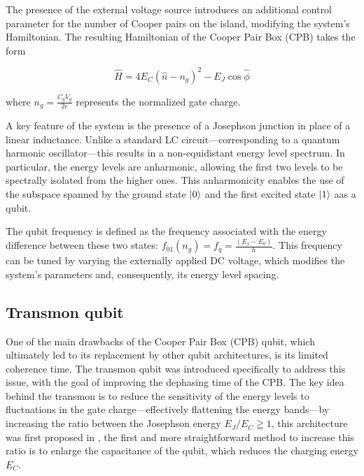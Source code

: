 The presence of the external voltage source introduces an additional control parameter for the number of Cooper pairs on the island, modifying the system's Hamiltonian. 
The resulting Hamiltonian of the Cooper Pair Box (CPB) takes the form

\begin{equation}\label{eq:CPB_complete}
    \hat{H} = 4E_C(\hat{n} - n_g)^2 - E_J \cos{\hat{\phi}}
\end{equation}

where $n_g = \frac{C_g V_g}{2e}$ represents the normalized gate charge.

A key feature of the system is the presence of a Josephson junction in place of a linear inductance. 
Unlike a standard LC circuit—corresponding to a quantum harmonic oscillator—this results in a non-equidistant energy level spectrum. 
In particular, the energy levels are anharmonic, allowing the first two levels to be spectrally isolated from the higher ones. 
This anharmonicity enables the use of the subspace spanned by the ground state $\ket{0}$ and the first excited state $\ket{1}$ aas a qubit.

The qubit frequency is defined as the frequency associated with the energy difference between these two states: $f_{01}(n_g) = f_q = \frac{(E_1 - E_0)}{h}$.
This frequency can be tuned by varying the externally applied DC voltage, which modifies the system’s parameters and, consequently, its energy level spacing.\\



\subsection{Transmon qubit}
One of the main drawbacks of the Cooper Pair Box (CPB) qubit, which ultimately led to its replacement by other qubit architectures, is its limited coherence time. 
The transmon qubit was introduced specifically to address this issue, with the goal of improving the dephasing time of the CPB. The key idea behind the transmon is to reduce the sensitivity of the energy levels to fluctuations in the gate charge—effectively flattening the energy bands—by increasing the ratio between the Josephson energy $E_J/E_C \geqq 1$,
this architecture was first proposed in \cite{TransmonPaper}, the first and more straightforward method to increase this ratio is to enlarge the capacitance of the qubit, which reduces the charging energy $E_C$.

